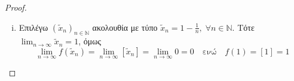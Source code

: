 \documentclass[main.tex]{subfiles}
\begin{document}
\begin{example}
\begin{enumerate}[wide,labelindent=0pt]
\begin{proof}
\begin{enumerate}[i.]
                    \item 
                        Επιλέγω $ {(\tilde{x}_{n})}_{ n \in \mathbb{N}} $ 
                        ακολουθία με τύπο 
                        $ \tilde{x}_{n} = 1 - \frac{1}{n}, \; \forall n \in 
                        \mathbb{N} $. Τότε
                        $ \lim_{n \to \infty} \tilde{x}_{n} = 1 $, όμως 
                        \[
                            \lim_{n \to \infty} f(\tilde{x}_{n}) = 
                            \lim_{n \to \infty} 
                            [\tilde{x}_{n}] = \lim_{n \to \infty} 0 = 0 \quad 
                            \text{ενώ} \quad  f(1) = [1] = 1 
                        \] 
                \end{enumerate}
            \end{proof}
    \end{enumerate}
\end{example}
\end{document}
